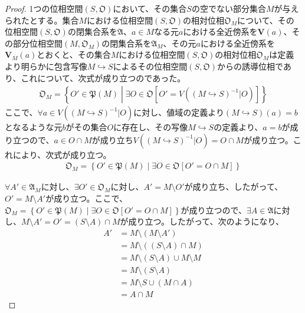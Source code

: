 \documentclass[dvipdfmx]{jsarticle}
\begin{document}
\begin{proof}
1つの位相空間$\left( S,\mathfrak{O} \right)$において、その集合$S$の空でない部分集合$M$が与えられたとする。集合$M$における位相空間$\left( S,\mathfrak{O} \right)$の相対位相$\mathfrak{O}_{M}$について、その位相空間$\left( S,\mathfrak{O} \right)$の閉集合系を$\mathfrak{A}$、$a \in M$なる元$a$における全近傍系を$\mathbf{V}(a)$、その部分位相空間$\left( M,\mathfrak{O}_{M} \right)$の閉集合系を$\mathfrak{A}_{M}$、その元$a$における全近傍系を$\mathbf{V}_{M}(a)$とおくと、その集合$M$における位相空間$\left( S,\mathfrak{O} \right)$の相対位相$\mathfrak{O}_{M}$は定義より明らかに包含写像$M \hookrightarrow S$によるその位相空間$\left( S,\mathfrak{O} \right)$からの誘導位相であり、これについて、次式が成り立つのであった。
\begin{align*}
\mathfrak{O}_{M} = \left\{ O'\in \mathfrak{P}(M) \middle| \exists O \in \mathfrak{O}\left[ O' = V\left( (M \hookrightarrow S)^{- 1}|O \right) \right] \right\}
\end{align*}
ここで、$\forall a \in V\left( (M \hookrightarrow S)^{- 1}|O \right)$に対し、値域の定義より$(M \hookrightarrow S)(a) = b$となるような元$b$がその集合$O$に存在し、その写像$M \hookrightarrow S$の定義より、$a = b$が成り立つので、$a \in O \cap M$が成り立ち$V\left( (M \hookrightarrow S)^{- 1}|O \right) = O \cap M$が成り立つ。これにより、次式が成り立つ。
\begin{align*}
\mathfrak{O}_{M} = \left\{ O'\in \mathfrak{P}(M) \middle| \exists O \in \mathfrak{O}\left[ O' = O \cap M \right] \right\}
\end{align*}\par
$\forall A' \in \mathfrak{A}_{M}$に対し、$\exists O' \in \mathfrak{O}_{M}$に対し、$A' = M \setminus O'$が成り立ち、したがって、$O' = M \setminus A'$が成り立つ。ここで、$\mathfrak{O}_{M} = \left\{ O'\in \mathfrak{P}(M) \middle| \exists O \in \mathfrak{O}\left[ O' = O \cap M \right] \right\}$が成り立つので、$\exists A \in \mathfrak{A}$に対し、$M \setminus A' = O' = (S \setminus A) \cap M$が成り立つ。したがって、次のようになり、
\begin{align*}
A' &= M \setminus \left( M \setminus A' \right)\\
&= M \setminus \left( (S \setminus A) \cap M \right)\\
&= M \setminus (S \setminus A) \cup M \setminus M\\
&= M \setminus (S \setminus A)\\
&= M \setminus S \cup (M \cap A)\\
&= A \cap M
\end{align*}

\end{proof}
\end{document}
